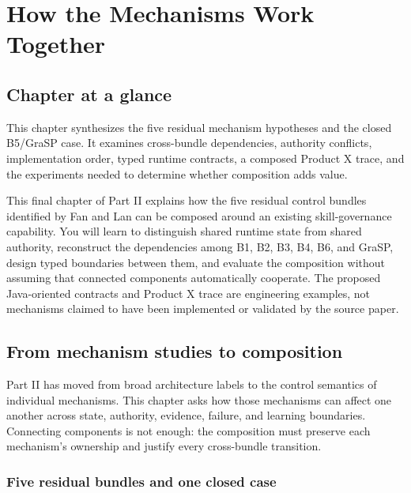 \chapter{How the Mechanisms Work Together}
\label{ch:mechanism-composition}

\section*{Chapter at a glance}
{}

This chapter synthesizes the five residual mechanism hypotheses and the closed B5/GraSP case. It examines cross-bundle dependencies, authority conflicts, implementation order, typed runtime contracts, a composed Product X trace, and the experiments needed to determine whether composition adds value.

\begin{learningbox}
This final chapter of Part II explains how the five residual control bundles identified by Fan and Lan can be composed around an existing skill-governance capability. You will learn to distinguish shared runtime state from shared authority, reconstruct the dependencies among B1, B2, B3, B4, B6, and GraSP, design typed boundaries between them, and evaluate the composition without assuming that connected components automatically cooperate. The proposed Java-oriented contracts and Product X trace are engineering examples, not mechanisms claimed to have been implemented or validated by the source paper.
\end{learningbox}

\section{From mechanism studies to composition}
\label{sec:ch18-from-mechanisms-to-composition}

Part II has moved from broad architecture labels to the control semantics of individual mechanisms. This chapter asks how those mechanisms can affect one another across state, authority, evidence, failure, and learning boundaries. Connecting components is not enough: the composition must preserve each mechanism's ownership and justify every cross-bundle transition.

\subsection{Five residual bundles and one closed case}
\label{subsec:ch18-five-and-one}

